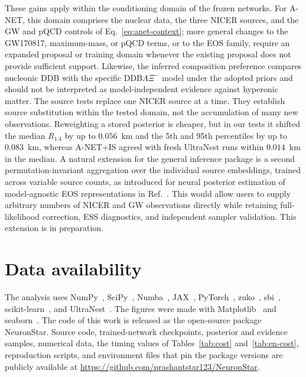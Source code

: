 \documentclass[aps,prd,twocolumn,superscriptaddress,nofootinbib,longbibliography]{revtex4-2}
\begin{document}
These gains apply within the conditioning domain of the
frozen networks. For A-NET, this domain comprises the nuclear data, the three
NICER sources, and the GW and pQCD controls of Eq.~\eqref{eq:anet-context};
more general changes to the GW170817, maximum-mass, or pQCD terms, or to the
EOS family, require an expanded proposal or training domain whenever the
existing proposal does not provide sufficient support. Likewise, the inferred
composition preference
compares nucleonic DDB with the specific DDB$\Lambda\Xi^-$ model under the
adopted priors and should not be interpreted as model-independent evidence
against hyperonic matter. The source tests replace one NICER source at a time. They establish source
substitution within the tested domain, not the accumulation of many new
observations. Reweighting a stored posterior is cheaper, but in our tests it
shifted the median $R_{1.4}$ by up to $0.056$~km and the 5th and 95th percentiles
by up to $0.083$~km, whereas A-NET+IS agreed with fresh UltraNest runs within
$0.014$~km in the median. A natural extension for the general inference
package is a second permutation-invariant aggregation over the individual
source embeddings, trained across variable source counts, as introduced for
neural posterior estimation of model-agnostic EOS representations in
Ref.~\cite{Carvalho:2026nbl}. This would allow
users to supply arbitrary numbers of NICER and GW observations directly while
retaining full-likelihood correction, ESS diagnostics, and independent
sampler validation. This extension is in preparation.

\noindent\begin{minipage}{\columnwidth}
\section*{Data availability}
\vspace{-0.75em}

The analysis uses NumPy~\cite{Harris:2020numpy}, SciPy~\cite{Virtanen:2020scipy},
Numba~\cite{Lam:2015numba}, JAX~\cite{Bradbury:2018jax},
PyTorch~\cite{Paszke:2019pytorch}, zuko~\cite{Rozet:2022zuko},
sbi~\cite{Boelts:2025sbi}, scikit-learn~\cite{Pedregosa:2011sklearn}, and
UltraNest~\cite{Buchner:2021cql}. The figures were made with
Matplotlib~\cite{Hunter:2007matplotlib} and seaborn~\cite{Waskom:2021seaborn}.
The code of this work is released as the open-source package NeuronStar.
Source code, trained-network checkpoints, posterior and
evidence samples, numerical data, the timing values of
Tables~\ref{tab:cost} and~\ref{tab:en-cost}, reproduction scripts, and
environment files that pin the package versions are publicly available at
\url{https://github.com/prashantstar123/NeuronStar}.
\end{minipage}
\end{document}
